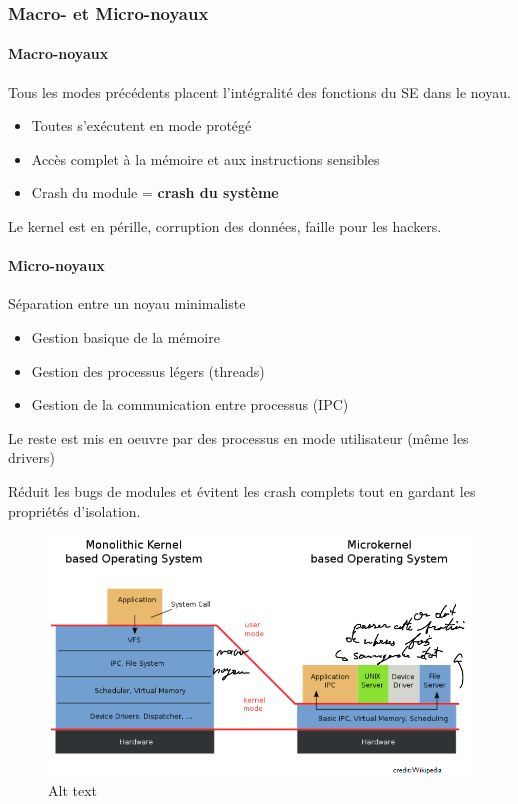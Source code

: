 \subsubsection{Macro- et Micro-noyaux}\label{macro--et-micro-noyaux}

\paragraph{Macro-noyaux}\label{macro-noyaux}

Tous les modes précédents placent l'intégralité des fonctions du SE dans
le noyau.

\begin{itemize}
\tightlist
\item
  Toutes s'exécutent en mode protégé
\item
  Accès complet à la mémoire et aux instructions sensibles
\item
  Crash du module = \textbf{crash du système}
\end{itemize}

Le kernel est en pérille, corruption des données, faille pour les
hackers.

\paragraph{Micro-noyaux}\label{micro-noyaux}

Séparation entre un noyau minimaliste

\begin{itemize}
\tightlist
\item
  Gestion basique de la mémoire
\item
  Gestion des processus légers (threads)
\item
  Gestion de la communication entre processus (IPC)
\end{itemize}

Le reste est mis en oeuvre par des processus en mode utilisateur (même
les drivers)

Réduit les bugs de modules et évitent les crash complets tout en gardant
les propriétés d'isolation.

\begin{figure}
\centering
\includegraphics{image-21.png}
\caption{Alt text}
\end{figure}

